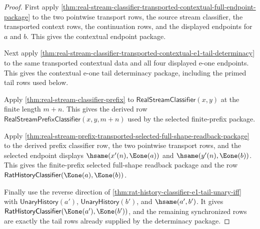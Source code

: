 \begin{proof}
First apply
\autoref{thm:real-stream-classifier-transported-contextual-full-endpoint-package}
to the two pointwise transport rows, the source stream classifier, the
transported context rows, the continuation rows, and the displayed endpoints
for $a$ and $b$. This gives the contextual endpoint package.

Next apply
\autoref{thm:real-stream-classifier-transported-contextual-e1-tail-determinacy}
to the same transported contextual data and all four displayed e-one endpoints.
This gives the contextual e-one tail determinacy package, including the primed
tail rows used below.

Apply \autoref{thm:real-stream-classifier-prefix} to
$\mathsf{RealStreamClassifier}(x,y)$ at the finite length $m+n$. This gives the
derived row $\mathsf{RealStreamPrefixClassifier}(x,y,m+n)$ used by the selected
finite-prefix package.

Apply
\autoref{thm:real-stream-prefix-transported-selected-full-shape-readback-package}
to the derived prefix classifier row, the two pointwise transport rows, and the
selected endpoint displays $\hsame(x'(n),\Eone(a))$ and
$\hsame(y'(n),\Eone(b))$. This gives the finite-prefix selected full-shape
readback package and the row
$\mathsf{RatHistoryClassifier}(\Eone(a),\Eone(b))$.

Finally use the reverse direction of
\autoref{thm:rat-history-classifier-e1-tail-unary-iff} with
$\mathsf{UnaryHistory}(a')$, $\mathsf{UnaryHistory}(b')$, and
$\hsame(a',b')$. It gives
$\mathsf{RatHistoryClassifier}(\Eone(a'),\Eone(b'))$, and the remaining
synchronized rows are exactly the tail rows already supplied by the
determinacy package.
\end{proof}

